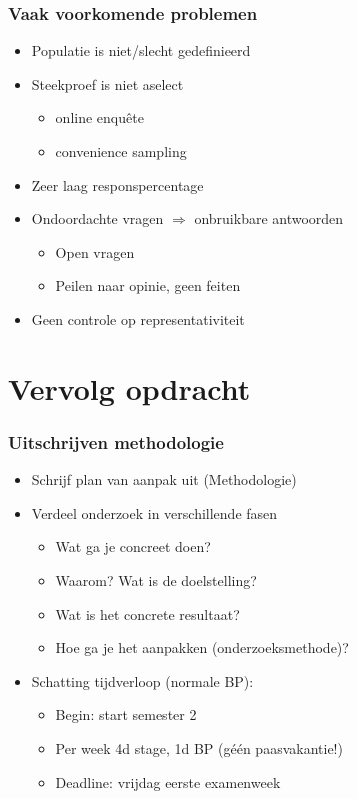 \documentclass[aspectratio=169]{beamer}
\begin{document}
\begin{frame}
  \frametitle{Vaak voorkomende problemen}

  \begin{itemize}
    \item Populatie is niet/slecht gedefinieerd
    \item Steekproef is niet aselect
      \begin{itemize}
        \item online enquête
        \item convenience sampling
      \end{itemize}
    \item Zeer laag responspercentage
    \item Ondoordachte vragen $\Rightarrow$ onbruikbare antwoorden
      \begin{itemize}
        \item Open vragen
        \item Peilen naar opinie, geen feiten
      \end{itemize}
    \item Geen controle op representativiteit
  \end{itemize}

\end{frame}

\section{Vervolg opdracht}

\begin{frame}
  \frametitle{Uitschrijven methodologie}

  \begin{itemize}
    \item Schrijf plan van aanpak uit (Methodologie)
    \item Verdeel onderzoek in verschillende fasen
      \begin{itemize}
        \item Wat ga je concreet doen?
        \item Waarom? Wat is de doelstelling?
        \item Wat is het concrete resultaat?
        \item Hoe ga je het aanpakken (onderzoeksmethode)?
      \end{itemize}
    \item Schatting tijdverloop (normale BP):
      \begin{itemize}
        \item Begin: start semester 2
        \item Per week 4d stage, 1d BP (géén paasvakantie!)
        \item Deadline: vrijdag eerste examenweek
      \end{itemize}
  \end{itemize}

\end{frame}
\end{document}
